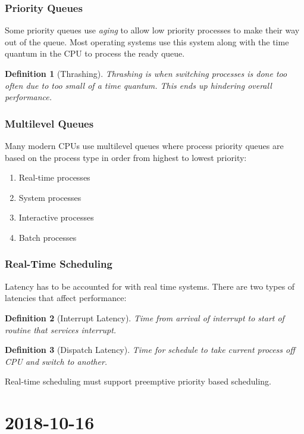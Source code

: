 \documentclass{report}
\newtheorem*{defn}{Definition}
\newcommand{\mychapter}[2]{
	\setcounter{chapter}{#1}
	\setcounter{section}{0}
	\chapter*{#2}
	\addcontentsline{toc}{chapter}{#2}
}
\begin{document}
\subsection{Priority Queues}
Some priority queues use \textit{aging} to allow low priority processes to make their way out of the queue. Most operating systems use this system along with the time quantum in the CPU to process the ready queue.\\

\begin{defn}[Thrashing] Thrashing is when switching processes is done too often due to too small of a time quantum. This ends up hindering overall performance.
\end{defn}

\subsection{Multilevel Queues}
Many modern CPUs use multilevel queues where process priority queues are based on the process type in order from highest to lowest priority:
\begin{enumerate}
	\item Real-time processes
	\item System processes
	\item Interactive processes
	\item Batch processes
\end{enumerate}

\subsection{Real-Time Scheduling}
Latency has to be accounted for with real time systems. There are two types of latencies that affect performance:

\begin{defn}[Interrupt Latency]
	Time from arrival of interrupt to start of routine that services interrupt.
\end{defn}

\begin{defn}[Dispatch Latency]
	Time for schedule to take current process off CPU and switch to another.
\end{defn}

\noindent
Real-time scheduling must support preemptive priority based scheduling.

\mychapter{4}{2018-10-16}
\end{document}
